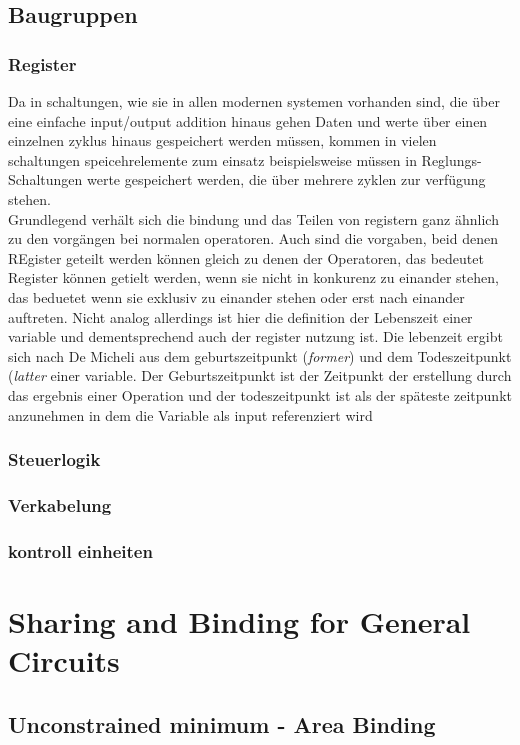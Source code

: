 \documentclass[conference]{IEEEtran}
\begin{document}
\subsection{Baugruppen}
 \subsubsection{Register}
 Da in schaltungen, wie sie in allen modernen systemen vorhanden sind, die über eine einfache input/output addition hinaus gehen Daten und werte über einen einzelnen zyklus hinaus gespeichert werden müssen, kommen in vielen schaltungen speicehrelemente zum einsatz beispielsweise müssen in Reglungs-Schaltungen werte gespeichert werden, die über mehrere zyklen zur verfügung stehen. \\
 Grundlegend verhält sich die bindung und das Teilen von registern ganz ähnlich zu den vorgängen bei normalen operatoren. Auch sind die vorgaben, beid denen REgister geteilt werden können gleich zu denen der Operatoren, das bedeutet Register können getielt werden, wenn sie nicht in konkurenz zu einander stehen, das beduetet wenn sie exklusiv zu einander stehen oder erst nach  einander auftreten. Nicht analog allerdings ist hier die definition der Lebenszeit einer variable und dementsprechend auch der register nutzung ist. Die lebenzeit ergibt sich nach De Micheli aus dem geburtszeitpunkt (\textit{former})  und dem Todeszeitpunkt (\textit{latter} einer variable. Der Geburtszeitpunkt ist der Zeitpunkt der erstellung durch das ergebnis einer Operation und der todeszeitpunkt ist als der späteste zeitpunkt anzunehmen in dem die Variable als input referenziert wird\cite[S. 240]{3}
 \subsubsection{Steuerlogik}
 \subsubsection{Verkabelung}
 \subsubsection{kontroll einheiten}
\section{Sharing and Binding for General Circuits}
\subsection{Unconstrained minimum - Area Binding}
\end{document}
